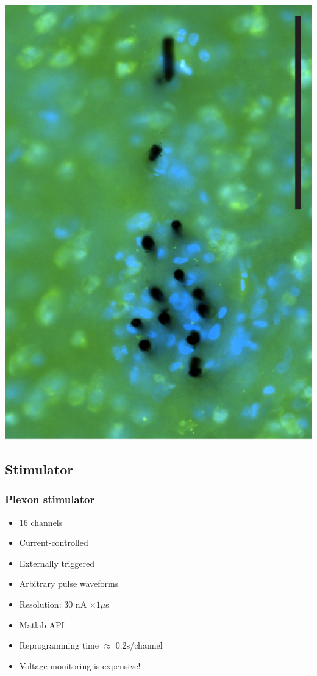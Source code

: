 \documentclass{beamer}
\begin{document}
\begin{frame}
\begin{center}
  \includegraphics[height=0.9\textheight]{CFHistSplayFronSanneImg2}
  \end{center}
\end{frame}

\subsection{Stimulator}

\begin{frame}
  \frametitle{Plexon stimulator}
  \begin{itemize}
    \item 16 channels
    \item Current-controlled
    \item Externally triggered
    \item Arbitrary pulse waveforms
    \item Resolution: 30 nA $\times 1 \mu$s
    \item Matlab API
    \item Reprogramming time $\approx$ 0.2s/channel
    \item Voltage monitoring is expensive!
  \end{itemize}
\end{frame}
\end{document}

